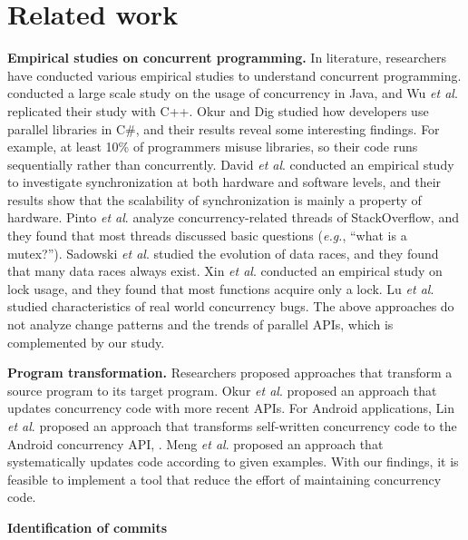 \section{Related work}
\noindent
\textbf{Empirical studies on concurrent programming.} In literature, researchers have conducted various empirical studies to understand concurrent programming. \cite{journals/jss/PintoTFFB15} conducted a large scale study on the usage of concurrency in Java, and Wu \textit{et al}. \cite{journals/infsof/WuCZX16} replicated their study with C++. Okur and Dig \cite{conf/sigsoft/OkurD12} studied how developers use parallel libraries in C\#, and their results reveal some interesting findings. For example, at least 10\% of programmers misuse libraries, so their code runs sequentially rather than concurrently. David \textit{et al}. \cite{conf/sosp/DavidGT13} conducted an empirical study to investigate synchronization at both hardware and software levels, and their results show that the scalability of synchronization is mainly a property of hardware. Pinto \textit{et al}. \cite{conf/oopsla/PintoTC15} analyze concurrency-related threads of StackOverflow, and they found that most threads discussed basic questions (\emph{e.g.}, ``what is a mutex?''). Sadowski \textit{et al}. \cite{conf/msr/SadowskiYK12} studied the evolution of data races, and they found that many data races always exist. Xin \textit{et al}. \cite{conf/icsm/XinQHXZWG13} conducted an empirical study on lock usage, and they found that most functions acquire only a lock. Lu \textit{et al}. \cite{conf/asplos/LuPSZ08} studied characteristics of real world concurrency bugs. The above approaches do not analyze change patterns and the trends of parallel APIs, which is complemented by our study. 

\noindent
\textbf{Program transformation.} Researchers proposed approaches that transform a source program to its target program. Okur \textit{et al}. \cite{conf/ecoop/OkurED14} proposed an approach that updates concurrency code with more recent APIs. For Android applications, Lin \textit{et al}. \cite{conf/sigsoft/LinRD14} proposed an approach that transforms self-written concurrency code to the Android concurrency API, . Meng \textit{et al}. \cite{conf/pldi/MengKM11} proposed an approach that systematically updates code according to given examples. With our findings, it is feasible to implement a tool that reduce the effort of maintaining concurrency code. 

\textbf{Identification of commits}
